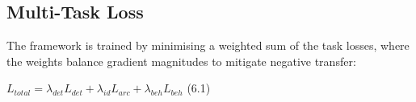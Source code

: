 \subsection{Multi-Task Loss}
The framework is trained by minimising a weighted sum of the task losses, where the weights balance gradient magnitudes to mitigate negative transfer:
\begin{flushright}
$L_{total} = \lambda_{det} L_{det} + \lambda_{id} L_{arc} + \lambda_{beh} L_{beh}$ \hspace{2cm} (6.1)
\end{flushright}
